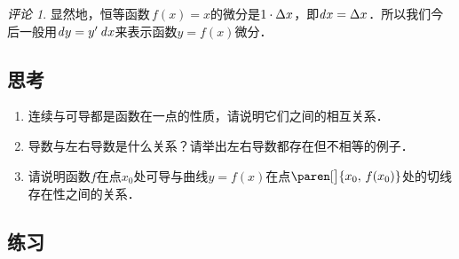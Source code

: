 \documentclass[a4paper,punct=CCT]{ctexbook}
\theoremstyle{definition}
\theoremstyle{remark}
\newtheorem*{remark}{评论}
\newif\ifshowex
\newif\ifshowsolp
\begin{document}
\begin{remark}
  显然地，恒等函数\(\,f(x) = x\)的微分是\(1 \cdot \mathop{}\!\Delta x\)，即\(\mathop{}\!\mathit{d} x = \mathop{}\!\Delta x\)．所以我们今后一般用\(\mathop{}\!\mathit{d} y = y' \mathop{}\!\mathit{d} x\)来表示函数\(y = f(x)\)微分．
\end{remark}


\subsection*{思考}

\begin{enumerate}
\item 连续与可导都是函数在一点的性质，请说明它们之间的相互关系．

  \ifshowsolp
  可导一定连续，连续未必可导（定理~\ref{thm:deriv2cont}）．
  \fi

\item 导数与左右导数是什么关系？请举出左右导数都存在但不相等的例子．

  \ifshowsolp
  见定理~\ref{thm:derivsided}．一个简单的例子就是绝对值函数\(\abs x\)．
  \fi

\item 请说明函数\(f\)在点\(x_0\)处可导与曲线\(y = f(x)\)在点\(\paren[\big]{x_0, \,f(x_0)}\)处的切线存在性之间的关系．

  \ifshowsolp
  可导则切线一定存在，切线存在未必可导．例如函数\(\!\sqrt[\leftroot{-2}\uproot{2}3] x\)在原点处的切线存在但不可导．
  \fi
\end{enumerate}

\ifshowex
{}
\subsection*{练习}
\end{document}
